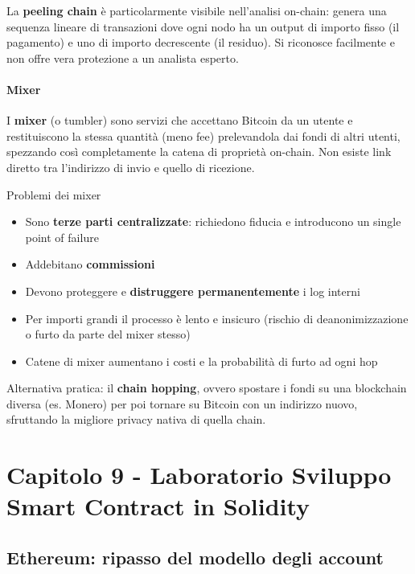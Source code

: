 \documentclass[
  italian,
  openany]{book}
\providecommand{\tightlist}{%
  \setlength{\itemsep}{0pt}\setlength{\parskip}{0pt}}
\begin{document}
La \textbf{peeling chain} è particolarmente visibile nell'analisi
on-chain: genera una sequenza lineare di transazioni dove ogni nodo ha
un output di importo fisso (il pagamento) e uno di importo decrescente
(il residuo). Si riconosce facilmente e non offre vera protezione a un
analista esperto.

\subsubsection{Mixer}\label{mixer}

I \textbf{mixer} (o tumbler) sono servizi che accettano Bitcoin da un
utente e restituiscono la stessa quantità (meno fee) prelevandola dai
fondi di altri utenti, spezzando così completamente la catena di
proprietà on-chain. Non esiste link diretto tra l'indirizzo di invio e
quello di ricezione.

\begin{calloutwarning}{Problemi dei mixer}

\begin{itemize}
\tightlist
\item
  Sono \textbf{terze parti centralizzate}: richiedono fiducia e
  introducono un single point of failure
\item
  Addebitano \textbf{commissioni}
\item
  Devono proteggere e \textbf{distruggere permanentemente} i log interni
\item
  Per importi grandi il processo è lento e insicuro (rischio di
  deanonimizzazione o furto da parte del mixer stesso)
\item
  Catene di mixer aumentano i costi e la probabilità di furto ad ogni
  hop
\end{itemize}

Alternativa pratica: il \textbf{chain hopping}, ovvero spostare i fondi
su una blockchain diversa (es. Monero) per poi tornare su Bitcoin con un
indirizzo nuovo, sfruttando la migliore privacy nativa di quella chain.

\end{calloutwarning}

\newpage

\chapter{Capitolo 9 - Laboratorio Sviluppo Smart Contract in
Solidity}\label{capitolo-9---laboratorio-sviluppo-smart-contract-in-solidity}

\section{Ethereum: ripasso del modello degli
account}\label{ethereum-ripasso-del-modello-degli-account}
\end{document}
